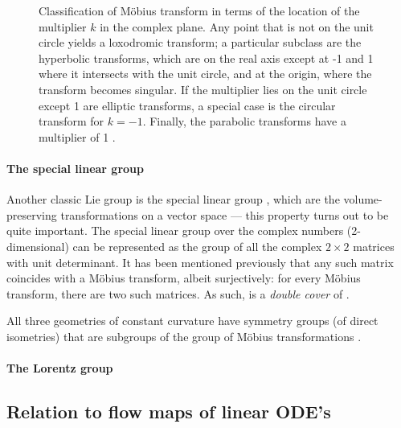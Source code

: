 \begin{figure}
    \centering
     
    \caption{Classification of Möbius transform in terms of the location of the multiplier \(k\) in the complex plane. Any point that is not on the unit circle yields a loxodromic transform; a particular subclass are the hyperbolic transforms, which are on the real axis except at -1 and 1 where it intersects with the unit circle, and at the origin, where the transform becomes singular. If the multiplier lies on the unit circle except 1 are elliptic transforms, a special case is the circular transform for \(k = -1\). Finally, the parabolic transforms have a multiplier of 1 \cite{Needham1997}.}
\end{figure}

\paragraph{The special linear group}
Another classic Lie group is the special linear group , which are the volume-preserving transformations on a vector space --- this property turns out to be quite important. The special linear group over the complex numbers (2-dimensional)  can be represented as the group of all the complex \(2\times2\) matrices with unit determinant. It has been mentioned previously that any such matrix coincides with a Möbius transform, albeit surjectively: for every Möbius transform, there are two such matrices. As such,  is a \emph{double cover} of \moebiusgroup.

All three geometries of constant curvature have symmetry groups (of direct isometries) that are subgroups of the group of Möbius transformations \cite{Needham2021}.

\paragraph{The Lorentz group}

\subsection{Relation to flow maps of linear ODE's}

